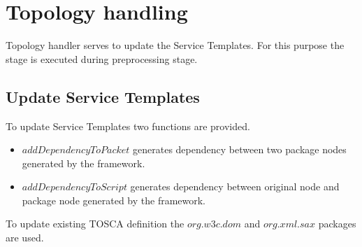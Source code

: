 \section{Topology handling}
Topology handler serves to update the Service Templates.
For this purpose the  stage is executed during preprocessing stage.

\subsection*{Update Service Templates}
To update Service Templates two functions are provided.
\begin{itemize}
	\item $addDependencyToPacket$ generates dependency between two package nodes generated by the framework.
	\item $addDependencyToScript$ generates dependency between original node and package node generated by the framework.
	 
\end{itemize} 
To update existing TOSCA definition the $org$.$w3c$.$dom$ and $org$.$xml$.$sax$ packages are used.
